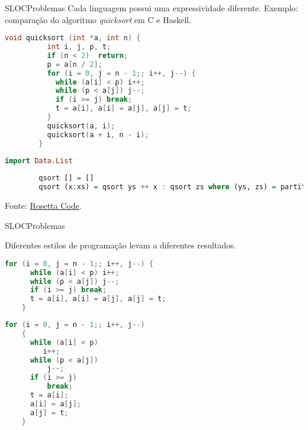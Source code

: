 \begin{frame}[fragile]{SLOC}{Problemas}\scriptsize
  \lstset{basicstyle=\scriptsize,numberstyle=\tiny,frame=single}
  Cada linguagem possui uma expressividade diferente. Exemplo: 
  comparação do algoritmo {\em quicksort} em C e Haskell.
  \begin{center}
      \begin{lstlisting}[language=C]
        void quicksort (int *a, int n) {
          int i, j, p, t;
          if (n < 2)  return;
          p = a[n / 2];
          for (i = 0, j = n - 1;; i++, j--) {
            while (a[i] < p) i++;
            while (p < a[j]) j--;
            if (i >= j) break;
            t = a[i], a[i] = a[j], a[j] = t;
          }
          quicksort(a, i);
          quicksort(a + i, n - i);
        }
      \end{lstlisting}\pause

      \begin{lstlisting}[language=haskell]
        import Data.List
 
        qsort [] = []
        qsort (x:xs) = qsort ys ++ x : qsort zs where (ys, zs) = partition (< x) xs
      \end{lstlisting}
    \end{center}
  {\tiny Fonte: \href{https://rosettacode.org/wiki/Sorting_algorithms/Quicksort}{Rosetta Code}.}
\end{frame}


\begin{frame}[fragile]{SLOC}{Problemas}

  Diferentes estilos de programação levam a diferentes resultados.

  \lstset{basicstyle=\scriptsize,numberstyle=\tiny,frame=single}
\begin{center}
  \begin{lstlisting}[language=C]
    for (i = 0, j = n - 1;; i++, j--) {
      while (a[i] < p) i++;
      while (p < a[j]) j--;
      if (i >= j) break;
      t = a[i], a[i] = a[j], a[j] = t;
    }
  \end{lstlisting}
  
  \begin{lstlisting}[language=C]
    for (i = 0, j = n - 1;; i++, j--) 
    {
      while (a[i] < p) 
         i++;
      while (p < a[j]) 
          j--;
      if (i >= j) 
          break;
      t = a[i]; 
      a[i] = a[j]; 
      a[j] = t;
    }
  \end{lstlisting}
\end{center}
\end{frame}

